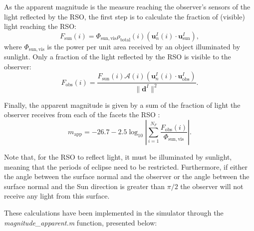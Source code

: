 As the apparent magnitude is the measure reaching the observer's sensors of the light reflected by the RSO, the first step is to calculate the fraction of (visible) light reaching the RSO:
\begin{equation}
    F_{\mathrm{sun}}(i)=\Phi_{\mathrm{sun,vis}}\rho_{\mathrm{total}}(i)(\mathbf{u}_{n}^{I}(i)\cdot\mathbf{u}_{\mathrm{sun}}^{I}),
\end{equation}
where $\Phi_{\mathrm{sun,vis}}$ is the power per unit area received by an object illuminated by sunlight. Only a fraction of the light reflected by the RSO is visible to the observer:
\begin{equation}
    F_{\mathrm{obs}}(i)=\frac{F_{\mathrm{sun}}(i)\mathcal{A}(i)(\mathbf{u}_{n}^{I}(i)\cdot\mathbf{u}_{\mathrm{obs}}^{I})}{\|\mathbf{d}^{I}\|^2}.
\end{equation}

Finally, the apparent magnitude is given by a sum of the fraction of light the observer receives from each of the facets  the RSO :
\begin{equation}
    m_{\mathrm{app}}=-26.7-2.5\log_{10}\left|\sum_{i=1}^{N_{F}}\frac{F_{\mathrm{obs}}(i)}{\Phi_{\mathrm{sun,vis}}}\right|.
    \label{eqn:mapp}
\end{equation}

Note that, for the RSO to reflect light, it must be illuminated by sunlight, meaning that the periods of eclipse need to be restricted. Furthermore, if either the angle between the surface normal and the observer or the angle between the surface normal and the Sun direction is greater than $\pi/2$ the observer will not receive any light from this surface. 

These calculations have been implemented in the simulator through the \textit{magnitude\_apparent.m} function, presented below:

   


       

